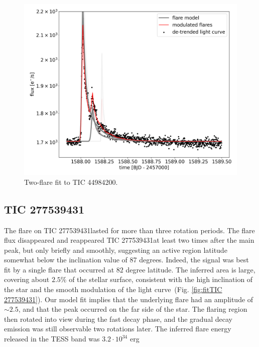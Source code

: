 \documentclass[fleqn,usenatbib,letters]{mnras}%
\newcommand{\FA}{TIC 277539431} %
\newcommand{\FB}{TIC 44984200} %
\begin{document}
\begin{figure}
	\includegraphics[width=\columnwidth]{figures/04_08_2020_13_40_TIC44984200_flarefit_50retrievals.png}
    \caption{Two-flare fit to \FB.}
    \label{fig:fit2\FB}
\end{figure}
\subsection{\FA}
The flare on \FA lasted for more than three rotation periods. The flare flux disappeared and reappeared \FA at least two times after the main peak, but only briefly and smoothly, suggesting an active region latitude somewhat below the inclination value of 87 degrees. Indeed, the signal was best fit by a single flare that occurred at $82$ degree latitude. The inferred area is large, covering about $2.5\%$ of the stellar surface, consistent with the high inclination of the star and the smooth modulation of the light curve~(Fig. \ref{fig:fit\FA}). Our model fit implies that the underlying flare had an amplitude of $\sim 2.5$, and that the peak occurred on the far side of the star. The flaring region then rotated into view during the fast decay phase, and the gradual decay emission was still observable two rotations later. The inferred flare energy released in the TESS band was $3.2\cdot 10^{34}$ erg
\end{document}
